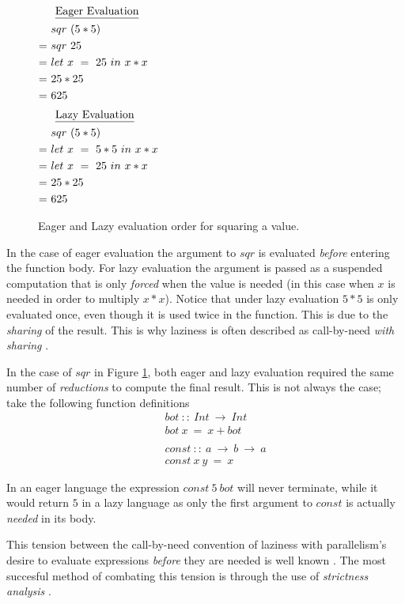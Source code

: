 \begin{figure}[!h]
\centering
\begin{multicols}{2}
\noindent
\begin{align*}
     \noalign{$\text{\underline{Eager Evaluation}}$}
     &sqr\ (5*5) \\
  =\ &sqr\ 25 \\
  =\ &let\ x\ =\ 25\ in\ x * x \\
  =\ &25 * 25 \\
  =\ &625
\end{align*}
\begin{align*}
     \noalign{$\text{\underline{Lazy Evaluation}}$}
     &sqr\ (5*5) \\
  =\ &let\ x\ =\ 5*5\ in\ x * x \\
  =\ &let\ x\ =\ 25\ in\ x * x \\
  =\ &25 * 25 \\
  =\ &625
\end{align*}
\end{multicols}
\caption{Eager and Lazy evaluation order for squaring a value.}
\label{fig:eagerandlazy}
\end{figure}

In the case of eager evaluation the argument to $sqr$ is evaluated
\emph{before} entering the function body. For lazy evaluation the argument is
passed as a suspended computation that is only \emph{forced} when the value is
needed (in this case when $x$ is needed in order to multiply $x*x$). Notice
that under lazy evaluation $5*5$ is only evaluated once, even though it is
used twice in the function. This is due to the \emph{sharing} of the result.
This is why laziness is often described as call-by-need \emph{with sharing}
\citep{hammond2000research}.

\medskip

In the case of $sqr$ in Figure \ref{fig:eagerandlazy}, both eager and lazy
evaluation required the same number of \emph{reductions} to compute the final
result. This is not always the case; take the following function definitions
\begin{align*}
    &bot \ :: \ Int\ \rightarrow\ Int \\
    &bot\ x\ =\ x + bot \\
    \quad & \\
    &const\ :: \ a\ \rightarrow\ b\ \rightarrow\ a \\
    &const\ x\ y\ =\ x
\end{align*}
\label{fig:botAndConst}

In an eager language the expression $const\ 5\ bot$ will never terminate,
while it would return $5$ in a lazy language as only the first argument
to $const$ is actually \emph{needed} in its body.

\medskip


This tension between the call-by-need convention of laziness with parallelism's
desire to evaluate expressions \emph{before} they are needed is well known
\citep{tremblay1995impact}. The most succesful method of combating this tension
is through the use of \emph{strictness analysis} \citep{mycroft1980theory,
wadler1987projections, hinze1995projection}.


